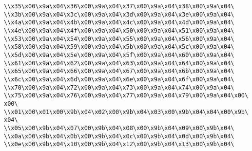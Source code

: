 \verb|\\x35\x00\x9a\x04\x36\x00\x9a\x04\x37\x00\x9a\x04\x38\x00\x9a\x04\|\newline
\verb|\\x3b\x00\x9a\x04\x3c\x00\x9a\x04\x3d\x00\x9a\x04\x3e\x00\x9a\x04\|\newline
\verb|\\x4a\x00\x9a\x04\x4b\x00\x9a\x04\x4c\x00\x9a\x04\x4d\x00\x9a\x04\|\newline
\verb|\\x4e\x00\x9a\x04\x4f\x00\x9a\x04\x50\x00\x9a\x04\x51\x00\x9a\x04\|\newline
\verb|\\x53\x00\x9a\x04\x54\x00\x9a\x04\x55\x00\x9a\x04\x56\x00\x9a\x04\|\newline
\verb|\\x58\x00\x9a\x04\x59\x00\x9a\x04\x5b\x00\x9a\x04\x5c\x00\x9a\x04\|\newline
\verb|\\x5d\x00\x9a\x04\x5e\x00\x9a\x04\x5f\x00\x9a\x04\x60\x00\x9a\x04\|\newline
\verb|\\x61\x00\x9a\x04\x62\x00\x9a\x04\x63\x00\x9a\x04\x64\x00\x9a\x04\|\newline
\verb|\\x65\x00\x9a\x04\x66\x00\x9a\x04\x67\x00\x9a\x04\x6b\x00\x9a\x04\|\newline
\verb|\\x6c\x00\x9a\x04\x6d\x00\x9a\x04\x6e\x00\x9a\x04\x6f\x00\x9a\x04\|\newline
\verb|\\x70\x00\x9a\x04\x72\x00\x9a\x04\x73\x00\x9a\x04\x74\x00\x9a\x04\|\newline
\verb|\\x75\x00\x9a\x04\x76\x00\x9a\x04\x77\x00\x9a\x04\x79\x00\x9a\x04\x00\x00\|\newline
\verb|\\x01\x00\x01\x00\x9b\x04\x02\x00\x9b\x04\x03\x00\x9b\x04\x04\x00\x9b\x04\|\newline
\verb|\\x05\x00\x9b\x04\x07\x00\x9b\x04\x08\x00\x9b\x04\x09\x00\x9b\x04\|\newline
\verb|\\x0a\x00\x9b\x04\x0b\x00\x9b\x04\x0c\x00\x9b\x04\x0d\x00\x9b\x04\|\newline
\verb|\\x0e\x00\x9b\x04\x10\x00\x9b\x04\x12\x00\x9b\x04\x13\x00\x9b\x04\|\newline
